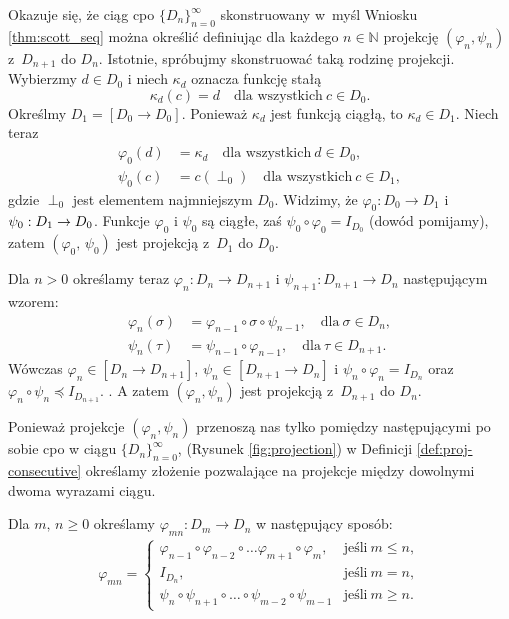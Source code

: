   Okazuje się, że ciąg cpo \(\{D_n\}_{n=0}^\infty\) skonstruowany w~myśl Wniosku \ref{thm:scott_seq} można określić definiując dla każdego \(n\in\mathbb{N}\) projekcję \((\varphi_n,\psi_n)\) z~\(D_{n+1}\) do \(D_n\). Istotnie, spróbujmy skonstruować taką rodzinę projekcji. Wybierzmy \(d\in D_0\) i niech \(\kappa_d\) oznacza funkcję stałą 
  \[\kappa_d(c)=d\quad \text{dla wszystkich}\ c\in D_0.\]
  Określmy \(D_1=[D_0\to D_0]\). Ponieważ \(\kappa_d\) jest funkcją ciągłą, to \(\kappa_d\in D_1\). Niech teraz
  \begin{align*}
    \varphi_0 (d) &= \kappa_d  \quad \text{dla wszystkich}\ d\in D_0,\\
    \psi_0(c) &= c(\perp_0) \quad \text{dla wszystkich}\ c\in D_1,
  \end{align*}
gdzie \(\perp_0\) jest elementem najmniejszym \(D_0\). Widzimy, że \(\varphi_0: D_0 \to D_1\) i \(\psi_0:\nobreak D_1\to\nobreak D_0\). Funkcje \(\varphi_0\) i \(\psi_0\) są ciągłe, zaś \(\psi_0\circ\varphi_0 = I_{D_0}\) (dowód pomijamy), zatem \((\varphi_0,\,\psi_0)\) jest projekcją z~\(D_1\) do \(D_0\).

Dla \(n>0\) określamy teraz \(\varphi_n : D_n \to D_{n+1}\) i \(\psi_{n+1}: D_{n+1}\to D_n\) następującym wzorem:
\begin{align*}
  \varphi_n(\sigma) &= \varphi_{n-1}\circ\sigma\circ\psi_{n-1},\quad \text{dla}\ \sigma\in D_n,\\ 
  \psi_n(\tau) &= \psi_{n-1}\circ\varphi_{n-1},\quad \text{dla}\ \tau \in D_{n+1}.
\end{align*}
Wówczas \(\varphi_n\in[D_n\to D_{n+1}]\), \(\psi_n\in[D_{n+1}\to D_n]\) i \(\psi_n\circ\varphi_n=I_{D_n}\) oraz \(\varphi_n\circ\psi_n\preceq I_{D_{n+1}}.\) \cite[Lemat 16.28]{Hindley:2008:LCI:1388400}. A zatem \((\varphi_n,\psi_n)\) jest projekcją z~\(D_{n+1}\) do \(D_n\).

Ponieważ projekcje \((\varphi_n, \psi_n)\) przenoszą nas tylko pomiędzy następującymi po sobie cpo w ciągu \(\{D_n\}_{n=0}^\infty\), (Rysunek \ref{fig:projection}) w Definicji \ref{def:proj-consecutive} określamy złożenie pozwalające na projekcje między dowolnymi dwoma wyrazami ciągu.

\begin{definicja}\label{def:proj-consecutive}%
Dla \(m,\,n\geq 0\) określamy \(\varphi_{mn}:D_m \to D_n\) w następujący sposób:
\begin{align*}
\varphi_{mn} =
\begin{cases}
\varphi_{n-1} \circ \varphi_{n-2} \circ \dots \varphi_{m+1} \circ \varphi_m, & \text{jeśli}\ m\leq n,\\
I_{D_n}, & \text{jeśli}\ m=n,\\
\psi_n \circ \psi_{n+1} \circ \dots \circ \psi_{m-2}\circ \psi_{m-1} & \text{jeśli}\ m\geq n.
\end{cases}
\end{align*}
\end{definicja}


